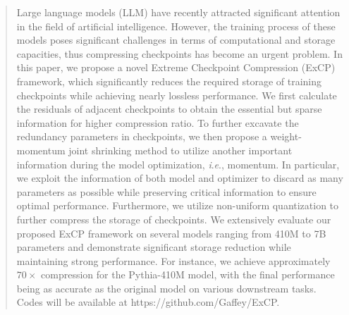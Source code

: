 \documentclass{article}
\theoremstyle{plain}
\theoremstyle{definition}
\theoremstyle{remark}
\newcommand{\ie}{\textit{i}.\textit{e}.}
\begin{document}
	\begin{CJK}{UTF8}{gbsn}
	



\printAffiliationsAndNotice{} %

\begin{abstract}
Large language models (LLM) have recently attracted significant attention in the field of artificial intelligence.
However, the training process of these models poses significant challenges in terms of computational and storage capacities, thus compressing checkpoints has become an urgent problem.
In this paper, we propose a novel Extreme Checkpoint Compression (ExCP) framework, which significantly reduces the required storage of training checkpoints while achieving nearly lossless performance. 
We first calculate the residuals of adjacent checkpoints to obtain the essential but sparse information for higher compression ratio.
To further excavate the redundancy parameters in checkpoints, we then propose a weight-momentum joint shrinking method to utilize another important information during the model optimization, \ie, momentum.
In particular, we exploit the information of both model and optimizer to discard as many parameters as possible while preserving critical information to ensure optimal performance.
Furthermore, we utilize non-uniform quantization to further compress the storage of checkpoints. 
We extensively evaluate our proposed ExCP framework on several models ranging from 410M to 7B parameters and demonstrate significant storage reduction while maintaining strong performance. For instance, we achieve approximately $70\times$ compression for the Pythia-410M model, with the final performance being as accurate as the original model on various downstream tasks. Codes will be available at https://github.com/Gaffey/ExCP.
\end{abstract}




\end{CJK}
\end{document}
